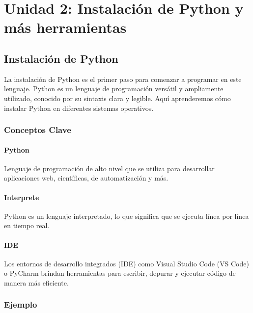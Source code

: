 \documentclass[
  a4paper,
  DIV=11,
  numbers=noendperiod,
  onepage,
  openany]{scrreprt}
\begin{document}
\part{Unidad 2: Instalación de Python y más herramientas}

\hypertarget{instalaciuxf3n-de-python}{%
\chapter{Instalación de Python}\label{instalaciuxf3n-de-python}}

La instalación de Python es el primer paso para comenzar a programar en
este lenguaje. Python es un lenguaje de programación versátil y
ampliamente utilizado, conocido por su sintaxis clara y legible. Aquí
aprenderemos cómo instalar Python en diferentes sistemas operativos.

\hypertarget{conceptos-clave-2}{%
\section{Conceptos Clave}\label{conceptos-clave-2}}

\hypertarget{python}{%
\subsection{Python}\label{python}}

Lenguaje de programación de alto nivel que se utiliza para desarrollar
aplicaciones web, científicas, de automatización y más.

\hypertarget{interprete}{%
\subsection{Interprete}\label{interprete}}

Python es un lenguaje interpretado, lo que significa que se ejecuta
línea por línea en tiempo real.

\hypertarget{ide}{%
\subsection{IDE}\label{ide}}

Los entornos de desarrollo integrados (IDE) como Visual Studio Code (VS
Code) o PyCharm brindan herramientas para escribir, depurar y ejecutar
código de manera más eficiente.

\hypertarget{ejemplo-2}{%
\section{Ejemplo}\label{ejemplo-2}}
\end{document}
